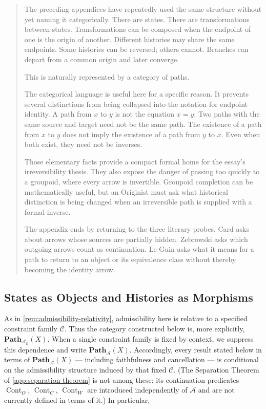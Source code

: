 \documentclass[
  11pt,
  a4paper,
  DIV=12,
  BCOR=0mm,
  parskip=half-
]{scrartcl}
\newcommand{\Cont}{\operatorname{Cont}}
\theoremstyle{definition}
\theoremstyle{plain}
\theoremstyle{remark}
\newenvironment{orientation}
  {%
    \begin{quote}
    \small
    \setlength{\parindent}{1em}
  }
  {%
    \end{quote}
  }
\begin{document}
\begin{orientation}
The preceding appendices have repeatedly used the same structure without yet
naming it categorically. There are states. There are transformations between
states. Transformations can be composed when the endpoint of one is the origin
of another. Different histories may share the same endpoints. Some histories
can be reversed; others cannot. Branches can depart from a common origin and
later converge.

This is naturally represented by a category of paths.

The categorical language is useful here for a specific reason. It prevents
several distinctions from being collapsed into the notation for endpoint
identity. A path from \(x\) to \(y\) is not the equation \(x=y\). Two paths
with the same source and target need not be the same path. The existence of a
path from \(x\) to \(y\) does not imply the existence of a path from \(y\) to
\(x\). Even when both exist, they need not be inverses.

Those elementary facts provide a compact formal home for the essay's
irreversibility thesis. They also expose the danger of passing too quickly to
a groupoid, where every arrow is invertible. Groupoid completion can be
mathematically useful, but an Originist must ask what historical distinction
is being changed when an irreversible path is supplied with a formal inverse.

The appendix ends by returning to the three literary probes. Card asks about
arrows whose sources are partially hidden. Zebrowski asks which outgoing
arrows count as continuation. Le Guin asks what it means for a path to return
to an object or its equivalence class without thereby becoming the identity
arrow.
\end{orientation}


\subsection{States as Objects and Histories as Morphisms}
\label{app:path-category-definition}

As in \cref{rem:admissibility-relativity}, admissibility here is relative to
a specified constraint family \(\mathcal C\). Thus the category constructed
below is, more explicitly, \(\mathbf{Path}_{\mathcal A_{\mathcal C}}(X)\).
When a single constraint family is fixed by context, we suppress this
dependence and write \(\mathbf{Path}_{\mathcal A}(X)\). Accordingly, every
result stated below in terms of \(\mathbf{Path}_{\mathcal A}(X)\) —
including faithfulness and cancellation — is conditional on the
admissibility structure induced by that fixed \(\mathcal C\). (The
Separation Theorem of \cref{app:separation-theorem} is not among these: its
continuation predicates \(\Cont_O\), \(\Cont_C\), \(\Cont_W\) are introduced
independently of \(\mathcal A\) and are not currently defined in terms of
it.) In particular,
\end{document}
